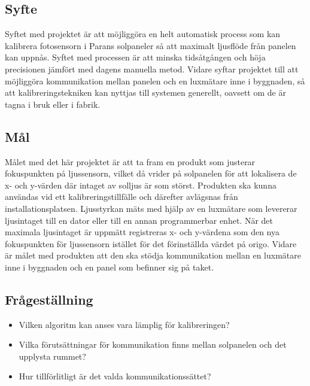     \subsection{Syfte} %
    \label{sub:syfte}
          Syftet med projektet är att möjliggöra en helt automatisk process som kan kalibrera fotosensorn i Parans solpaneler så att maximalt ljusflöde från panelen kan uppnås. Syftet med processen är att minska tidsåtgången och höja precisionen jämfört med dagens manuella metod. 
          Vidare syftar projektet till att möjliggöra kommunikation mellan panelen och en luxmätare inne i byggnaden, så att kalibreringstekniken kan nyttjas till systemen generellt, oavsett om de är tagna i bruk eller i fabrik.

    \subsection{Mål} %
    \label{sub:mal}
        Målet med det här projektet är att ta fram en produkt som justerar fokuspunkten på ljussensorn, vilket då vrider på solpanelen för att lokalisera de x- och y-värden där intaget av solljus är som störst. Produkten ska kunna användas vid ett kalibreringstillfälle och därefter avlägsnas från installationsplatsen.
        Ljusstyrkan mäts med hjälp av en luxmätare som levererar ljusintaget till en dator eller till en annan programmerbar enhet. 
        När det maximala ljusintaget är uppmätt registreras x- och y-värdena som den nya fokuspunkten för ljussensorn istället för det förinställda värdet på origo. 
        Vidare är målet med produkten att den ska stödja kommunikation mellan en luxmätare inne i byggnaden och en panel som befinner sig på taket. 


    \subsection{Frågeställning} %
    \label{sub:fragestallning}
        \begin{itemize}
            \item Vilken algoritm kan anses vara lämplig för kalibreringen?
            \item Vilka förutsättningar för kommunikation finns mellan solpanelen och \newline det upplysta rummet? 
            \item Hur tillförlitligt är det valda kommunikationssättet? 
            
        \end{itemize}

